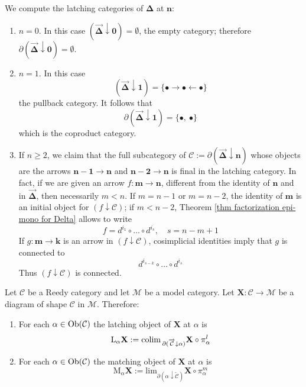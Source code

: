 \begin{eg} \label{eg computing latching categories}
We compute the latching categories of $\mathbf \Delta$ at $\mathbf n$:
\begin{enumerate}
\item $n = 0$. In this case $( \overrightarrow{\mathbf \Delta} \downarrow \mathbf 0 ) = \emptyset$, the empty category; therefore $\partial (\overrightarrow{\mathbf \Delta} \downarrow \mathbf 0) = \emptyset$.
\item $n = 1$. In this case
\[
(\overrightarrow{\mathbf \Delta} \downarrow \mathbf 1) = \{\bullet \rightarrow \bullet \leftarrow \bullet \}
\]
the pullback category. It follows that
\[
\partial ( \overrightarrow{ \mathbf \Delta} \downarrow \mathbf 1 ) = \{\bullet, \: \bullet \}
\]
which is the coproduct category.
\item If $n \ge 2$, we claim that the full subcategory of $\mathcal C := \partial ( \overrightarrow{\mathbf \Delta} \downarrow \mathbf n )$ whose objects are the arrows $\mathbf{n-1} \to \mathbf n$ and $\mathbf{n-2} \to \mathbf n$ is final in the latching category. In fact, if we are given an arrow $f \colon \mathbf m \to \mathbf n$, different from the identity of $\mathbf n$ and in $\overrightarrow{\mathbf \Delta}$, then necessarily $m < n$. If $m = n - 1$ or $m = n - 2$, the identity of $\mathbf m$ is an initial object for $(f \downarrow \mathcal C)$; if $m < n-2$, Theorem \ref{thm factorization epi-mono for Delta} allows to write
\[
f = d^{i_1} \circ \ldots \circ d^{i_s}, \quad s = n - m + 1
\]
If $g \colon \mathbf m \to \mathbf k$ is an arrow in $(f \downarrow \mathcal C)$, cosimplicial identities imply that $g$ is connected to
\[
d^{i_{s-k}} \circ \ldots \circ d^{i_s}
\]
Thus $(f \downarrow \mathcal C)$ is connected.
\end{enumerate}
\end{eg}

\begin{defin}
Let $\mathcal C$ be a Reedy category and let $\mathcal M$ be a model category. Let $\mathbf X \colon \mathcal C \to \mathcal M$ be a diagram of shape $\mathcal C$ in $\mathcal M$. Therefore:
\begin{enumerate}
\item For each $\alpha \in \mathrm{Ob}(\mathcal C)$ the latching object of $\mathbf X$ at $\alpha$ is
\[
\mathrm L_\alpha \mathbf X := \mathrm{colim} \,_{\partial ( \overrightarrow{\mathcal C} \downarrow \alpha )} \mathbf X \circ \pi_\alpha^l
\]
\item For each $\alpha \in \mathrm{Ob}(\mathcal C)$ the matching object of $\mathbf X$ at $\alpha$ is
\[
\mathrm M_\alpha \mathbf X := \mathrm{lim}_{\partial ( \alpha \downarrow \overleftarrow{\mathcal C} )} \mathbf X \circ \pi_\alpha^m
\]
\end{enumerate}
\end{defin}

